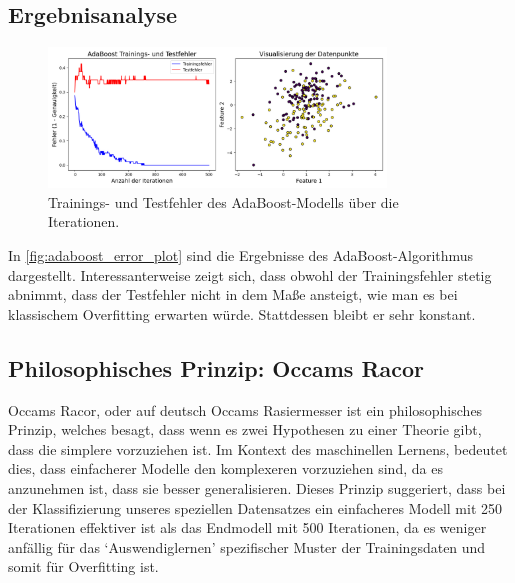 \subsection{Ergebnisanalyse}
\begin{figure}[h]
    \centering
    \includegraphics[width=0.8\textwidth]{Images/AdaBoost_Error_and_Data.png}
    \caption{Trainings- und Testfehler des AdaBoost-Modells über die Iterationen.}
    \label{fig:adaboost_error_plot}
\end{figure}
In \autoref{fig:adaboost_error_plot} sind die Ergebnisse des AdaBoost-Algorithmus dargestellt. Interessanterweise zeigt sich, dass obwohl der Trainingsfehler stetig abnimmt, dass der Testfehler nicht in dem Maße ansteigt, wie man es bei klassischem Overfitting erwarten würde. Stattdessen bleibt er sehr konstant.

\subsection{Philosophisches Prinzip: Occams Racor}
Occams Racor, oder auf deutsch Occams Rasiermesser ist ein philosophisches Prinzip, welches besagt, dass wenn es zwei Hypothesen zu einer Theorie gibt, dass die simplere vorzuziehen ist. Im Kontext des maschinellen Lernens, bedeutet dies, dass einfacherer Modelle den komplexeren vorzuziehen sind, da es anzunehmen ist, dass sie besser generalisieren. Dieses Prinzip suggeriert, dass bei der Klassifizierung unseres speziellen Datensatzes ein einfacheres Modell mit 250 Iterationen effektiver ist als das Endmodell mit 500 Iterationen, da es weniger anfällig für das `Auswendiglernen' spezifischer Muster der Trainingsdaten und somit für Overfitting ist.

